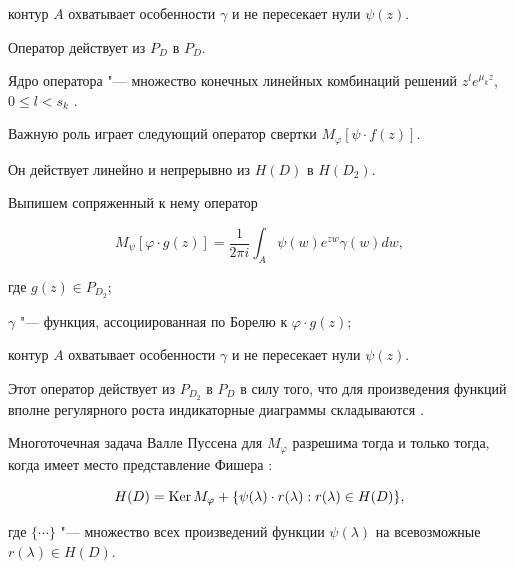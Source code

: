 контур $A$ охватывает особенности $\gamma$ и не пересекает нули $\psi(z)$.

Оператор действует из $P_D$ в $P_D$. 

Ядро оператора "--- множество конечных линейных комбинаций решений $z^le^{\mu_k z}$, $0\leq l< s_k$ \cite{zabirova4}.



Важную роль играет следующий оператор свертки $M_{\varphi}[\psi \cdot f(z)]$. 

Он действует линейно и непрерывно из $H(D)$ в $H(D_2)$. 

Выпишем сопряженный к нему оператор 

$$

M_{\psi}[\varphi \cdot g(z)]=\frac {1}{2\pi i}\int _{A}{\psi(w) e^{zw}\gamma(w)dw},

$$ 

где $g(z)\in P_{D_2}$; 

$\gamma $ "--- функция, ассоциированная по Борелю к $\varphi\cdot g(z)$; 

контур $A$ охватывает особенности $\gamma$ и не пересекает нули $\psi(z)$. 

Этот оператор действует из $P_{D_2}$ в $P_D$ в силу того, что для произведения функций вполне регулярного роста индикаторные диаграммы складываются \cite[c.~207]{zabirova1}. 



\smallskip

\pagebreak







\hypertarget{nap:z:t1}{}

\begin{theorem}[1]Многоточечная задача Валле Пуссена для $M_\varphi$ разрешима тогда и только тогда$,$ когда имеет место представление Фишера \rm \cite{zabirova7}:

\begin{equation} 

\label{nap:z:eq3}

H(D)=\mathop{\rm Ker} M_\varphi+\{\psi (\lambda)\cdot r(\lambda):r(\lambda)\in H(D)\},

\end{equation} \it

где $\{{} \cdots {}\}$ "--- множество всех произведений функции $\psi(\lambda)$ на всевозможные   $r(\lambda)\in H(D)$.

\end{theorem}



